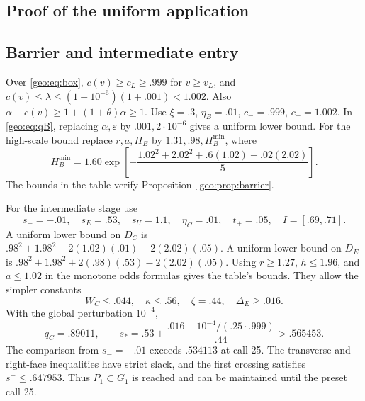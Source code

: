\subsection{Proof of the uniform application}
\subsection{Barrier and intermediate entry}
Over \eqref{geo:eq:box}, $c(v)\ge c_L\ge.999$ for $v\ge v_L$, and
$c(v)\le\lambda\le(1+10^{-6})(1+.001)<1.002$.
Also $\alpha+c(v)\ge1+(1+\theta)\alpha\ge1$.
Use $\xi=.3$, $\eta_B=.01$, $c_-=.999$, $c_+=1.002$.
In \eqref{geo:eq:qB}, replacing $\alpha,\varepsilon$ by $.001,2\cdot10^{-6}$ gives
a uniform lower bound. For the high-scale bound replace $r,a,H_B$ by
$1.31,.98,H_B^{\min}$, where
\[
 H_B^{\min}=1.60\exp\left[-\frac{1.02^2+2.02^2+.6(1.02)+.02(2.02)}{5}\right].
\]
The bounds in the table verify Proposition~\ref{geo:prop:barrier}.

For the intermediate stage use
\[
 s_-=-.01,\quad s_E=.53,\quad s_U=1.1,\quad
 \eta_C=.01,\quad t_+=.05,\quad I=[.69,.71].
\]
A uniform lower bound on $D_C$ is
$.98^2+1.98^2-2(1.02)(.01)-2(2.02)(.05)$.
A uniform lower bound on $D_E$ is
$.98^2+1.98^2+2(.98)(.53)-2(2.02)(.05)$.
Using $r\ge1.27$, $h\le1.96$, and $a\le1.02$ in the monotone odds formulas
gives the table's bounds. They allow the simpler constants
\[
 W_C\le.044,\quad\kappa\le.56,\quad\zeta=.44,\quad\Delta_E\ge.016.
\]
With the global perturbation $10^{-4}$,
\[
 q_C=.89011,\qquad s_*=.53+
 \frac{.016-10^{-4}/(.25\cdot.999)}{.44}>.565453.
\]
The comparison from $s_-=-.01$ exceeds $.534113$ at call 25.
The transverse and right-face inequalities have strict slack, and the first
crossing satisfies $s^+\le.647953$. Thus $P_1\subset G_1$ is reached and can
be maintained until the preset call 25.

